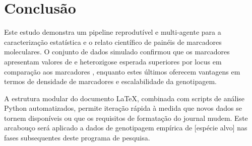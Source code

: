 
\section{Conclusão}
\label{sec:conclusion}

Este estudo demonstra um pipeline reprodutível e multi-agente para a
caracterização estatística e o relato científico de painéis de marcadores
moleculares. O conjunto de dados simulado confirmou que os marcadores \ssr{}
apresentam valores de \pic{} e heterozigose esperada superiores por locus
em comparação aos marcadores \snp{}, enquanto estes últimos oferecem
vantagens em termos de densidade de marcadores e escalabilidade da
genotipagem.

A estrutura modular do documento \LaTeX{}, combinada com scripts de análise
Python automatizados, permite iteração rápida à medida que novos dados se
tornem disponíveis ou que os requisitos de formatação do journal mudem.
Este arcabouço será aplicado a dados de genotipagem empírica de [espécie
alvo] nas fases subsequentes deste programa de pesquisa.

